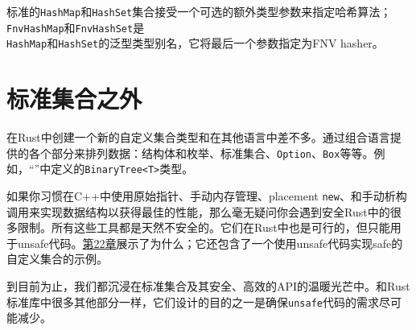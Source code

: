 标准的\texttt{HashMap}和\texttt{HashSet}集合接受一个可选的额外类型参数来指定哈希算法；\texttt{FnvHashMap}和\texttt{FnvHashSet}是\\
\texttt{HashMap}和\texttt{HashSet}的泛型类型别名，它将最后一个参数指定为FNV hasher。

\section{标准集合之外}

在Rust中创建一个新的自定义集合类型和在其他语言中差不多。通过组合语言提供的各个部分来排列数据：结构体和枚举、标准集合、\texttt{Option}、\texttt{Box}等等。例如，“”中定义的\texttt{BinaryTree<T>}类型。

如果你习惯在C++中使用原始指针、手动内存管理、placement \texttt{new}、和手动析构调用来实现数据结构以获得最佳的性能，那么毫无疑问你会遇到安全Rust中的很多限制。所有这些工具都是天然不安全的。它们在Rust中也是可行的，但只能用于unsafe代码。\hyperref[ch22]{第22章}展示了为什么；它还包含了一个使用unsafe代码实现safe的自定义集合的示例。

到目前为止，我们都沉浸在标准集合及其安全、高效的API的温暖光芒中。和Rust标准库中很多其他部分一样，它们设计的目的之一是确保\texttt{unsafe}代码的需求尽可能减少。
